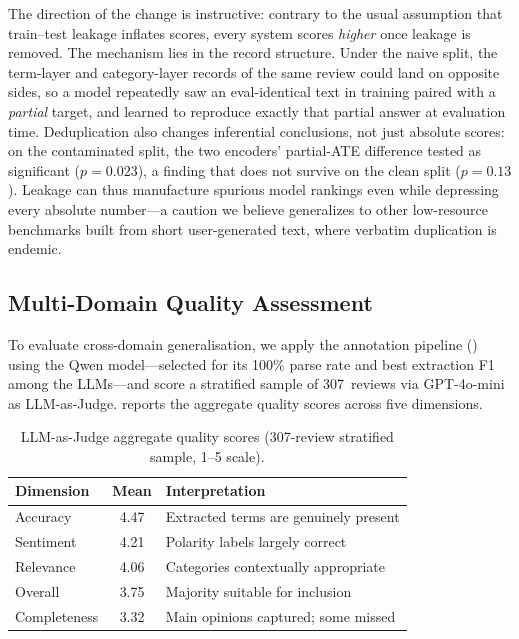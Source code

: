 \documentclass[bdcc,article,submit,moreauthors]{Definitions/mdpi}
\begin{document}
The direction of the change is instructive: contrary to the usual assumption that train--test leakage inflates scores, every system scores \emph{higher} once leakage is removed. The mechanism lies in the record structure. Under the naive split, the term-layer and category-layer records of the same review could land on opposite sides, so a model repeatedly saw an eval-identical text in training paired with a \emph{partial} target, and learned to reproduce exactly that partial answer at evaluation time. Deduplication also changes inferential conclusions, not just absolute scores: on the contaminated split, the two encoders' partial-ATE difference tested as significant ($p{=}0.023$), a finding that does not survive on the clean split ($p{=}0.13$). Leakage can thus manufacture spurious model rankings even while depressing every absolute number---a caution we believe generalizes to other low-resource benchmarks built from short user-generated text, where verbatim duplication is endemic.

\subsection{Multi-Domain Quality Assessment}
\label{sec:res_multidomain}

To evaluate cross-domain generalisation, we apply the annotation pipeline () using the Qwen model---selected for its 100\% parse rate and best extraction F1 among the LLMs---and score a stratified sample of 307~reviews via GPT-4o-mini as LLM-as-Judge.  reports the aggregate quality scores across five dimensions.

\begin{table}[t]
\centering
\caption{LLM-as-Judge aggregate quality scores (307-review stratified sample, 1--5 scale).}
\label{tab:judge_agg}
\begin{tabular}{lc l}
\toprule
\textbf{Dimension} & \textbf{Mean} & \textbf{Interpretation} \\
\midrule
Accuracy     & 4.47 & Extracted terms are genuinely present \\
Sentiment    & 4.21 & Polarity labels largely correct \\
Relevance    & 4.06 & Categories contextually appropriate \\
Overall      & 3.75 & Majority suitable for inclusion \\
Completeness & 3.32 & Main opinions captured; some missed \\
\bottomrule
\end{tabular}
\end{table}
\end{document}
